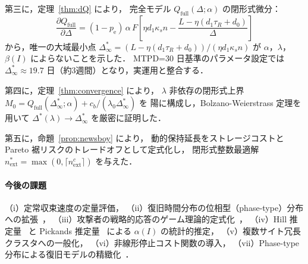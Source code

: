 \documentclass[12pt,a4paper]{article}
\theoremstyle{plain}
\theoremstyle{definition}
\theoremstyle{remark}
\newcommand{\pe}{p_{\mathrm{e}}}
\newcommand{\Qf}{Q_{\mathrm{full}}}
\newcommand{\betaI}{\beta(I)}
\newcommand{\alphI}{\alpha(I)}
\newcommand{\Dopt}{\Delta^{*}}
\newcommand{\Dinf}{\Delta^{*}_{\infty}}
\begin{document}
第三に，定理~\ref{thm:dQ} により，
完全モデル $\Qf(\Delta;\alpha)$ の閉形式微分：
\[
\frac{\partial\Qf}{\partial\Delta}
=(1-\pe)\,\alpha\,F\!\left[\eta d_1\kappa_s n-\frac{L-\eta(d_1\tau_R+d_0)}{\Delta}\right]
\]
から，唯一の大域最小点 $\Dinf=(L-\eta(d_1\tau_R+d_0))/(\eta d_1\kappa_s n)$ が
$\alpha$，$\lambda$，$\betaI$ によらないことを示した．
MTPD=30 日基準のパラメータ設定では $\Dinf\approx19.7$ 日（約3週間）となり，実運用と整合する．

第四に，定理~\ref{thm:convergence} により，
$\lambda$ 非依存の閉形式上界 $M_0=\Qf(\Dinf;\alpha)+c_b/(\lambda_0\Dinf)$ を
陽に構成し，Bolzano-Weierstrass 定理を用いて $\Dopt(\lambda)\to\Dinf$ を厳密に証明した．

第五に，命題~\ref{prop:newsboy} により，
動的保持延長をストレージコストと Pareto 裾リスクのトレードオフとして定式化し，
閉形式整数最適解 $n_{\mathrm{ext}}^*=\max(0,\lceil n_{\mathrm{ext}}^c\rceil)$ を与えた．

\paragraph{今後の課題}
（i）定常収束速度の定量評価，
（ii）復旧時間分布の位相型（phase-type）分布への拡張~\cite{asmussen2003}，
（iii）攻撃者の戦略的応答のゲーム理論的定式化~\cite{laszka2017}，
（iv）Hill 推定量~\cite{hill1975} と Pickands 推定量~\cite{pickands1975} による $\alphI$ の統計的推定，
（v）複数サイト冗長クラスタへの一般化，
（vi）非線形停止コスト関数の導入，
（vii）Phase-type 分布による復旧モデルの精緻化~\cite{norris1997}．

\end{document}
